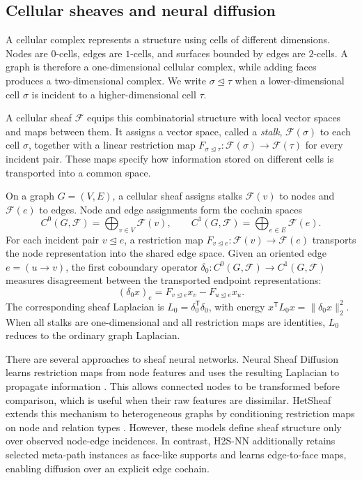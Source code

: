 \documentclass[sigconf,anonymous,review]{acmart}
\newcommand{\method}{\textsc{H2S-NN}}
\newcommand{\cF}{\mathcal{F}}
\newcommand{\transpose}{\mathsf{T}}
\begin{document}
\subsection{Cellular sheaves and neural diffusion}

A cellular complex represents a structure using cells of different dimensions. Nodes are
\(0\)-cells, edges are \(1\)-cells, and surfaces bounded by edges are \(2\)-cells. A graph is
therefore a one-dimensional cellular complex, while adding faces produces a two-dimensional
complex. We write \(\sigma\unlhd\tau\) when a lower-dimensional cell \(\sigma\) is incident to a
higher-dimensional cell \(\tau\).

A cellular sheaf \(\cF\) equips this combinatorial structure with local vector spaces and maps
between them. It assigns a vector space, called a \emph{stalk}, \(\cF(\sigma)\) to each cell
\(\sigma\), together with a linear restriction map
\(F_{\sigma\unlhd\tau}:\cF(\sigma)\rightarrow\cF(\tau)\) for every incident pair. These maps
specify how information stored on different cells is transported into a common space.

On a graph \(G=(V,E)\), a cellular sheaf assigns stalks \(\cF(v)\) to nodes and \(\cF(e)\) to
edges. Node and edge assignments form the cochain spaces
\begin{equation}
  C^0(G,\cF)=\bigoplus_{v\in V}\cF(v),
  \qquad
  C^1(G,\cF)=\bigoplus_{e\in E}\cF(e).
\end{equation}
For each incident pair \(v\unlhd e\), a restriction map
\(F_{v\unlhd e}:\cF(v)\rightarrow\cF(e)\) transports the node representation into the shared edge
space. Given an oriented edge \(e=(u\rightarrow v)\), the first coboundary operator
\(\delta_0:C^0(G,\cF)\rightarrow C^1(G,\cF)\) measures disagreement between the transported endpoint
representations:
\begin{equation}
  (\delta_0x)_e
  =
  F_{v\unlhd e}x_v-F_{u\unlhd e}x_u.
  \label{eq:prelim-delta0}
\end{equation}
The corresponding sheaf Laplacian is
\(L_0=\delta_0^{\transpose}\delta_0\), with energy
\(x^{\transpose}L_0x=\lVert\delta_0x\rVert_2^2\). When all stalks are one-dimensional and all
restriction maps are identities, \(L_0\) reduces to the ordinary graph Laplacian.

There are several approaches to sheaf neural networks. Neural Sheaf Diffusion learns restriction maps from node features and uses the resulting Laplacian to propagate information \cite{bodnar2022neural}. This allows connected nodes to be transformed
before comparison, which is useful when their raw features are dissimilar. HetSheaf extends this
mechanism to heterogeneous graphs by conditioning restriction maps on node and relation types
\cite{braithwaite2024heterogeneous}. However, these models define sheaf structure only over observed
node-edge incidences. In contrast, \method{} additionally retains selected meta-path instances as
face-like supports and learns edge-to-face maps, enabling diffusion over an explicit edge cochain.
\end{document}
